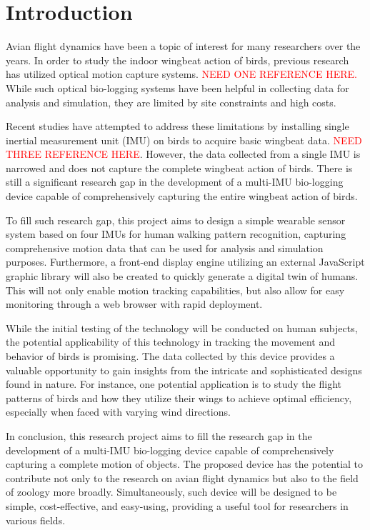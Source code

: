 \chapter{Introduction}
Avian flight dynamics have been a topic of interest for many researchers over the years.
In order to study the indoor wingbeat action of birds, previous research has utilized optical motion capture systems.
\cite{ju_data-driven_2011}
    \textcolor{red}{NEED ONE REFERENCE HERE.} %
While such optical bio-logging systems have been helpful in collecting data for analysis and simulation, they are limited by site constraints and high costs.

Recent studies have attempted to address these limitations by installing single inertial measurement unit (IMU) on birds to acquire basic wingbeat data.
\textcolor{red}{NEED THREE REFERENCE HERE}.
However, the data collected from a single IMU is narrowed and does not capture the complete wingbeat action of birds. There is still a significant research gap in the development of a multi-IMU bio-logging device capable of comprehensively capturing the entire wingbeat action of birds.

To fill such research gap, this project aims to design a simple wearable sensor system based on four IMUs for human walking pattern recognition, capturing comprehensive motion data that can be used for analysis and simulation purposes. Furthermore, a front-end display engine utilizing an external JavaScript graphic library will also be created to quickly generate a digital twin of humans. This will not only enable motion tracking capabilities, but also allow for easy monitoring through a web browser with rapid deployment.

While the initial testing of the technology will be conducted on human subjects, the potential applicability of this technology in tracking the movement and behavior of birds is promising. The data collected by this device provides a valuable opportunity to gain insights from the intricate and sophisticated designs found in nature. For instance, one potential application is to study the flight patterns of birds and how they utilize their wings to achieve optimal efficiency, especially when faced with varying wind directions.

In conclusion, this research project aims to fill the research gap in the development of a multi-IMU bio-logging device capable of comprehensively capturing a complete motion of objects. The proposed device has the potential to contribute not only to the research on avian flight dynamics but also to the field of zoology more broadly. Simultaneously, such device will be designed to be simple, cost-effective, and easy-using, providing a useful tool for researchers in various fields.


